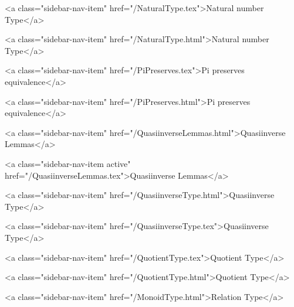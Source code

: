       
        
          <a class="sidebar-nav-item" href="/NaturalType.tex">Natural number Type</a>
        
      
    
      
        
          <a class="sidebar-nav-item" href="/NaturalType.html">Natural number Type</a>
        
      
    
      
        
          <a class="sidebar-nav-item" href="/PiPreserves.tex">Pi preserves equivalence</a>
        
      
    
      
        
          <a class="sidebar-nav-item" href="/PiPreserves.html">Pi preserves equivalence</a>
        
      
    
      
        
          <a class="sidebar-nav-item" href="/QuasiinverseLemmas.html">Quasiinverse Lemmas</a>
        
      
    
      
        
          <a class="sidebar-nav-item active" href="/QuasiinverseLemmas.tex">Quasiinverse Lemmas</a>
        
      
    
      
        
          <a class="sidebar-nav-item" href="/QuasiinverseType.html">Quasiinverse Type</a>
        
      
    
      
        
          <a class="sidebar-nav-item" href="/QuasiinverseType.tex">Quasiinverse Type</a>
        
      
    
      
        
          <a class="sidebar-nav-item" href="/QuotientType.tex">Quotient Type</a>
        
      
    
      
        
          <a class="sidebar-nav-item" href="/QuotientType.html">Quotient Type</a>
        
      
    
      
        
          <a class="sidebar-nav-item" href="/MonoidType.html">Relation Type</a>
        
